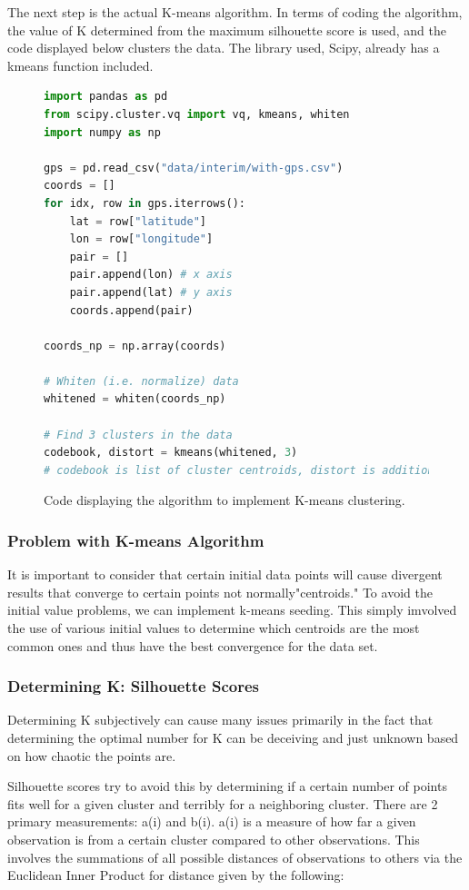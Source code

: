 \documentclass[12pt]{article}
\begin{document}
The next step is the actual K-means algorithm.
In terms of coding the algorithm, the value of K determined from the maximum silhouette score is used, and the code displayed below clusters the data.
The library used, Scipy, already has a kmeans function included. 
 \begin{figure}[H]
    \centering
    \begin{lstlisting}[language=Python]
import pandas as pd
from scipy.cluster.vq import vq, kmeans, whiten
import numpy as np

gps = pd.read_csv("data/interim/with-gps.csv")
coords = []
for idx, row in gps.iterrows():
    lat = row["latitude"]
    lon = row["longitude"]
    pair = []
    pair.append(lon) # x axis
    pair.append(lat) # y axis
    coords.append(pair)

coords_np = np.array(coords)

# Whiten (i.e. normalize) data
whitened = whiten(coords_np)

# Find 3 clusters in the data
codebook, distort = kmeans(whitened, 3)
# codebook is list of cluster centroids, distort is additional data
    \end{lstlisting}
    \caption{Code displaying the algorithm to implement K-means clustering.}
    \label{fig:k-means-code2}
\end{figure}
\subsubsection{Problem with K-means Algorithm}
It is important to consider that certain initial data points will cause divergent results that converge to certain points not normally"centroids." To avoid the initial value problems, we can implement k-means seeding. This simply imvolved the use of various initial values to determine which centroids are the most common ones and thus have the best convergence for the data set.
\subsubsection{Determining K: Silhouette Scores}
Determining K subjectively can cause many issues primarily in the fact that determining the optimal number for K can be deceiving and just unknown based on how chaotic the points are. 

Silhouette scores try to avoid this by determining if a certain number of points fits well for a given cluster and terribly for a neighboring cluster. There are 2 primary measurements: a(i) and b(i). a(i) is a measure of how far a given observation is from a certain cluster compared to other observations. This involves the summations of all possible distances of observations to others via the Euclidean Inner Product for distance given by the following:
\end{document}
